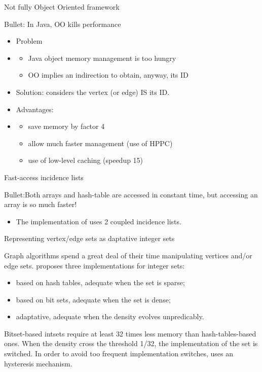 \documentclass{beamer}
\begin{document}
\begin{frame}{Not fully Object Oriented framework}

\alert{Bullet}: In Java, OO kills performance

\begin{itemize}
\item Problem
\item 
	\begin{itemize}
		\item  Java object memory management is too hungry
		\item OO implies an indirection to obtain, anyway, its ID
	 \end{itemize}
\item Solution: \grph considers the vertex (or edge) IS its ID.
\item Advantages:
\item 
	\begin{itemize}
		\item save memory by factor 4
		\item allow much faster management (use of HPPC)
		\item use of low-level caching (speedup 15)
	 \end{itemize}
\end{itemize}
\end{frame}


\begin{frame}{Fast-access incidence lists}

\alert{Bullet}:Both arrays and hash-table are accessed in constant time, but accessing an array is so much faster!
\begin{itemize}
	\item The  implementation of \grph  uses 2 coupled incidence lists.
\end{itemize}
\end{frame}


\begin{frame}{Representing vertex/edge sets as daptative integer sets}

Graph algorithms spend a great deal of their time manipulating vertices and/or edge sets.
\grph proposes three implementations for integer sets:
	  \begin{itemize}
\item based on \alert{hash tables}, adequate when the set is \alert{sparse};
\item based on \alert{bit sets}, adequate when the set is \alert{dense};
\item \alert{adaptative}, adequate when the density evolves unpredicably.
	  \end{itemize}
Bitset-based intsets require at least 32 times less memory than hash-tables-based ones.
When the density cross the threshold 1/32, the implementation of the set is switched.
In order to avoid too frequent implementation switches, \grph uses an hysteresis mechanism.
\end{frame}
\end{document}
